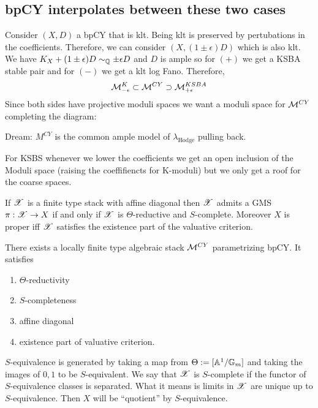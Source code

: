 \documentclass[12pt]{article}
\begin{document}
\subsection{bpCY interpolates between these two cases}

Consider $(X, D)$ a bpCY that is klt. Being klt is preserved by pertubations in the coefficients. Therefore, we can consider $(X, (1 \pm \epsilon) D)$ which is also klt. We have $K_X + (1 \pm \epsilon) D \sim_{\mathbb{Q}} \pm \epsilon D$ and $D$ is ample so for $(+)$ we get a KSBA stable pair and for $(-)$ we get a klt log Fano. Therefore,
\[ \mathcal{M}^K_{-\epsilon} \subset \mathcal{M}^{CY} \supset \mathcal{M}^{KSBA}_{+\epsilon} \]
Since both sides have projective moduli spaces we want a moduli space for $\mathcal{M}^{CY}$ completing the diagram:
\begin{center}
\end{center}
Dream: $M^{CY}$ is the common ample model of $\lambda_{\text{Hodge}}$ pulling back. 


For KSBS whenever we lower the coefficients we get an open inclusion of the Moduli space (raising the coeffifiencts for K-moduli) but we only get a roof for the coarse spaces. 

\begin{theorem}
If $\mathscr{X}$ is a finite type stack with affine diagonal then $\mathscr{X}$ admits a GMS $\pi : \mathscr{X} \to X$ if and only if $\mathscr{X}$ is $\Theta$-reductive and $S$-complete. Moreover $X$ is proper iff $\mathscr{X}$ satisfies the existence part of the valuative criterion.
\end{theorem}

\begin{theorem}[WILDBAB]
There exists a locally finite type algebraic stack $\mathcal{M}^{CY}$ parametrizing bpCY. It satisfies
\begin{enumerate}
\item $\Theta$-reductivity
\item $S$-completeness
\item affine diagonal
\item existence part of valuative criterion.
\end{enumerate}
\end{theorem}

\begin{rmk}
$S$-equivalence is generated by taking a map from $\Theta := [\mathbb{A}^1 / \mathbb{G}_m]$ and taking the images of $0,1$ to be $S$-equivalent. We say that $\mathscr{X}$ is $S$-complete if the functor of $S$-equivalence classes is separated. What it means is limits in $\mathscr{X}$ are unique up to $S$-equivalence. Then $X$ will be ``quotient'' by $S$-equivalence. 
\end{rmk}
\end{document}
